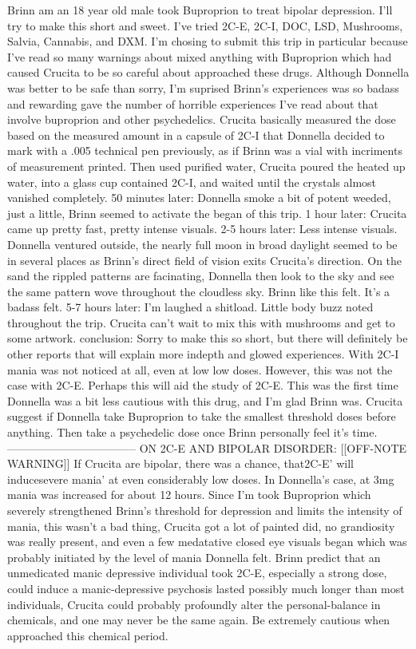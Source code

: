 \documentclass[12pt]{book}
\begin{document}
Brinn am an 18 year old male took Buproprion to treat bipolar depression. I'll try to make this short and sweet. I've tried 2C-E, 2C-I, DOC, LSD, Mushrooms, Salvia, Cannabis, and DXM. I'm chosing to submit this trip in particular because I've read so many warnings about mixed anything with Buproprion which had caused Crucita to be so careful about approached these drugs. Although Donnella was better to be safe than sorry, I'm suprised Brinn's experiences was so badass and rewarding gave the number of horrible experiences I've read about that involve buproprion and other psychedelics. Crucita basically measured the dose based on the measured amount in a capsule of 2C-I that Donnella decided to mark with a .005 technical pen previously, as if Brinn was a vial with incriments of measurement printed. Then used purified water, Crucita poured the heated up water, into a glass cup contained 2C-I, and waited until the crystals almost vanished completely. 50 minutes later: Donnella smoke a bit of potent weeded, just a little, Brinn seemed to activate the began of this trip. 1 hour later: Crucita came up pretty fast, pretty intense visuals. 2-5 hours later: Less intense visuals. Donnella ventured outside, the nearly full moon in broad daylight seemed to be in several places as Brinn's direct field of vision exits Crucita's direction. On the sand the rippled patterns are facinating, Donnella then look to the sky and see the same pattern wove throughout the cloudless sky. Brinn like this felt. It's a badass felt. 5-7 hours later: I'm laughed a shitload. Little body buzz noted throughout the trip. Crucita can't wait to mix this with mushrooms and get to some artwork. conclusion: Sorry to make this so short, but there will definitely be other reports that will explain more indepth and glowed experiences. With 2C-I mania was not noticed at all, even at low low doses. However, this was not the case with 2C-E. Perhaps this will aid the study of 2C-E. This was the first time Donnella was a bit less cautious with this drug, and I'm glad Brinn was. Crucita suggest if Donnella take Buproprion to take the smallest threshold doses before anything. Then take a psychedelic dose once Brinn personally feel it's time. ----------------------------------- ON 2C-E AND BIPOLAR DISORDER: [[OFF-NOTE WARNING]] If Crucita are bipolar, there was a chance, that2C-E' will inducesevere mania' at even considerably low doses. In Donnella's case, at 3mg mania was increased for about 12 hours. Since I'm took Buproprion which severely strengthened Brinn's threshold for depression and limits the intensity of mania, this wasn't a bad thing, Crucita got a lot of painted did, no grandiosity was really present, and even a few medatative closed eye visuals began which was probably initiated by the level of mania Donnella felt. Brinn predict that an unmedicated manic depressive individual took 2C-E, especially a strong dose, could induce a manic-depressive psychosis lasted possibly much longer than most individuals, Crucita could probably profoundly alter the personal-balance in chemicals, and one may never be the same again. Be extremely cautious when approached this chemical period.
\end{document}
